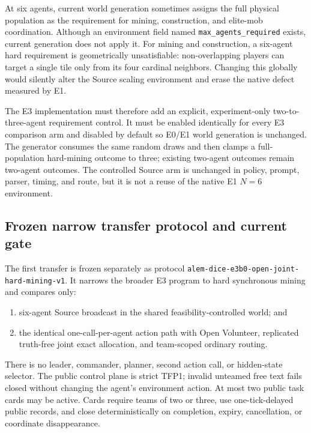 \documentclass[11pt]{article}
\newcommand{\code}[1]{\texttt{#1}}
\begin{document}
At six agents, current world generation sometimes assigns the full physical
population as the requirement for mining, construction, and elite-mob
coordination.  Although an environment field named
\code{max\_agents\_required} exists, current generation does not apply it.
For mining and construction, a six-agent hard requirement is geometrically
unsatisfiable: non-overlapping players can target a single tile only from its
four cardinal neighbors.  Changing this globally would silently alter the
Source scaling environment and erase the native defect measured by E1.

The E3 implementation must therefore add an explicit, experiment-only
two-to-three-agent requirement control.  It must be enabled identically for
every E3 comparison arm and disabled by default so E0/E1 world generation is
unchanged.  The generator consumes the same random draws and then clamps a
full-population hard-mining outcome to three; existing two-agent outcomes
remain two-agent outcomes.  The controlled Source arm is unchanged in policy,
prompt, parser, timing, and route, but it is not a reuse of the native E1
$N=6$ environment.

\subsection{Frozen narrow transfer protocol and current gate}

The first transfer is frozen separately as protocol
\code{alem-dice-e3b0-open-joint-hard-mining-v1}.  It narrows the broader E3
program to hard synchronous mining and compares only:

\begin{enumerate}
  \item six-agent Source broadcast in the shared feasibility-controlled world;
  and
  \item the identical one-call-per-agent action path with Open Volunteer,
  replicated truth-free joint exact allocation, and team-scoped ordinary
  routing.
\end{enumerate}

There is no leader, commander, planner, second action call, or hidden-state
selector.  The public control plane is strict TFP1; invalid unteamed free text
fails closed without changing the agent's environment action.  At most two
public task cards may be active.  Cards require teams of two or three, use
one-tick-delayed public records, and close deterministically on completion,
expiry, cancellation, or coordinate disappearance.
\end{document}
